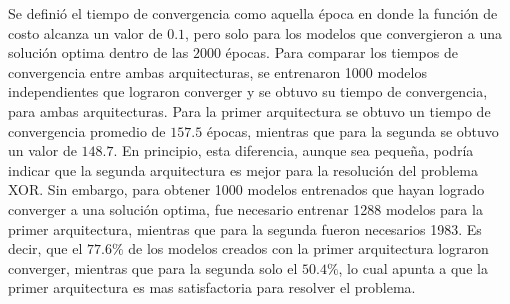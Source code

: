 Se definió el tiempo de convergencia como aquella época en donde la función de costo alcanza un valor de $0.1$, pero solo para los modelos que convergieron a una solución optima dentro de las $2000$ épocas. Para comparar los tiempos de convergencia entre ambas arquitecturas, se entrenaron 1000 modelos independientes que lograron converger y se obtuvo su tiempo de convergencia, para ambas arquitecturas. Para la primer arquitectura se obtuvo un tiempo de convergencia promedio de $157.5$ épocas, mientras que para la segunda se obtuvo un valor de $148.7$. En principio, esta diferencia, aunque sea pequeña, podría indicar que la segunda arquitectura es mejor para la resolución del problema XOR. Sin embargo, para obtener 1000 modelos entrenados que hayan logrado converger a una solución optima, fue necesario entrenar 1288 modelos para la primer arquitectura, mientras que para la segunda fueron necesarios 1983. Es decir, que el $77.6\%$ de los modelos creados con la primer arquitectura lograron converger, mientras que para la segunda solo el $50.4\%$, lo cual apunta a que la primer arquitectura es mas satisfactoria para resolver el problema.